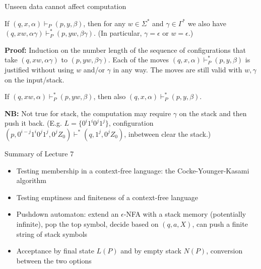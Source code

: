 \documentclass[handout]{beamer}
\begin{document}
\begin{frame}{Unseen data cannot affect computation}

    \begin{lemma}
        If $(q,x,\alpha)\vdash_P (p,y,\beta) $, then for any $w\in \Sigma^*$ and $\gamma\in\Gamma^*$ we also have 
        $(q,xw,\alpha\gamma)\vdash^*_P(p,yw,\beta\gamma)$. (In particular, $\gamma=\epsilon$ or $w=\epsilon$.)
    \end{lemma}
    \textbf{Proof:} Induction on the number length of the sequence of configurations that take $(q,xw,\alpha\gamma)$ to $(p,yw,\beta\gamma)$. Each of the moves $(q,x,\alpha)\vdash^*_P(p,y,\beta)$ is justified without using $w$ and/or $\gamma$ in any way. The moves are still valid with $w,\gamma$ on the input/stack.\hfill\qedsymbol

    \medskip

    \begin{lemma}
        If $(q,xw,\alpha)\vdash^*_P (p,yw,\beta) $, then also $(q,x,\alpha)\vdash^*_P(p,y,\beta)$.
    \end{lemma}
    \textbf{NB:} Not true for stack, the computation may require $\gamma$ on the stack and then push it back. (E.g. $L=\{0^i1^i0^j1^j\}$, configuration $(p,0^{i-j}1^i0^j1^j,0^jZ_0)\vdash^* (q,1^j,0^jZ_0)$, inbetween clear the stack.)

\end{frame}


\begin{frame}{Summary of Lecture 7}
	
	\begin{itemize}    
        \item Testing membership in a context-free language: the Cocke-Younger-Kasami algorithm
        \item Testing emptiness and finiteness of a context-free language    
		\item Pushdown automaton: extend an $\epsilon$-NFA with a stack memory (potentially infinite), pop the top symbol, decide based on $(q,a,X)$, can push a finite string of stack symbols
        \item Acceptance by final state $L(P)$ and by empty stack $N(P)$, conversion between the two options        	
	\end{itemize}

\end{frame}
\end{document}
